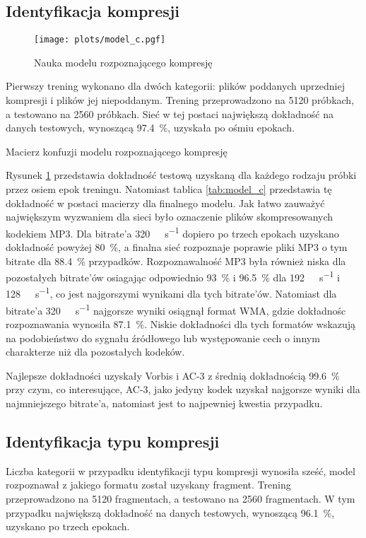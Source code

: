 \documentclass[pl,12pt]{aghdpl}
\let\Oldsubsection\subsection%
\renewcommand{\subsection}{\FloatBarrier\Oldsubsection}
\begin{document}
\subsection{Identyfikacja kompresji}
\begin{figure}[!tbh]
  \centering
  \texttt{[image: plots/model\_c.pgf]}
  \caption{Nauka modelu rozpoznającego kompresję}
  \label{fig:model_c}
\end{figure}
Pierwszy trening wykonano dla dwóch kategorii: plików poddanych uprzedniej
kompresji i plików jej niepoddanym. Trening przeprowadzono na 5120 próbkach, a
testowano na 2560 próbkach. Sieć w tej postaci największą dokładność na danych
testowych, wynoszącą \SI{97.4}{\percent}, uzyskała po ośmiu epokach.

\begin{table}[!tbh]
  \centering
  \caption{Macierz konfuzji modelu rozpoznającego kompresję}
  
  \label{tab:model_c}
\end{table}

Rysunek \ref{fig:model_c} przedstawia dokładność testową uzyskaną dla każdego
rodzaju próbki przez osiem epok treningu. Natomiast tablica \ref{tab:model_c}
przedstawia tę dokładność w postaci macierzy dla finalnego modelu. Jak łatwo
zauważyć największym wyzwaniem dla sieci było oznaczenie plików skompresowanych
kodekiem MP3. Dla bitrate'a \SI{320}{\kibi\bit\per\second} dopiero po trzech
epokach uzyskano dokładność powyżej \SI{80}{\percent}, a finalna sieć
rozpoznaje poprawie pliki MP3 o tym bitrate dla \SI{88.4}{\percent} przypadków.
Rozpoznawalność MP3 była również niska dla pozostałych bitrate'ów osiagając
odpowiednio \SI{93}{\percent} i \SI{96.5}{\percent} dla
\SI{192}{\kibi\bit\per\second} i \SI{128}{\kibi\bit\per\second}, co jest
najgorszymi wynikami dla tych bitrate'ów. Natomiast dla bitrate'a
\SI{320}{\kibi\bit\per\second} najgorsze wyniki osiągnął format WMA, gdzie
dokładnośc rozpoznawania wynosiła \SI{87.1}{\percent}. Niskie dokładności dla
tych formatów wskazują na podobieństwo do sygnału źródłowego lub występowanie
cech o innym charakterze niż dla pozostałych kodeków.

Najlepsze dokładności uzyskały Vorbis i AC-3 z średnią dokładnością
\SI{99.6}{\percent} przy czym, co interesujące, AC-3, jako jedyny kodek uzyskał
najgorsze wyniki dla najmniejszego bitrate'a, natomiast jest to najpewniej
kwestia przypadku.
\subsection{Identyfikacja typu kompresji}
Liczba kategorii w przypadku identyfikacji typu kompresji wynosiła sześć, model
rozpoznawał z jakiego formatu został uzyskany fragment. Trening przeprowadzono
na 5120 fragmentach, a testowano na 2560 fragmentach. W tym przypadku
największą dokładność na danych testowych, wynoszącą \SI{96.1}{\percent},
uzyskano po trzech epokach.
\end{document}
